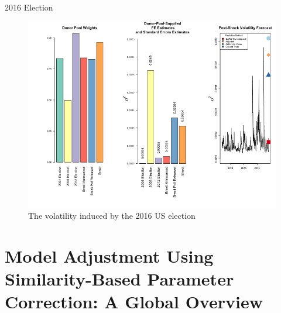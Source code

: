 \documentclass[9pt]{beamer}
\theoremstyle{definition}
\begin{document}
\begin{frame}{2016 Election}
    \begin{figure}[H]
        \begin{center}
          \includegraphics[scale=.34]{real_data_output_plots/TueSep241059512024_IYG_None_None.png}
          \caption{The volatility induced by the 2016 US election}
          \label{fig:SVF_2016}
          \end{center}
        \end{figure}
\end{frame}

\section{Model Adjustment Using Similarity-Based Parameter Correction:
A Global Overview}\label{SVF_properties}
\end{document}
